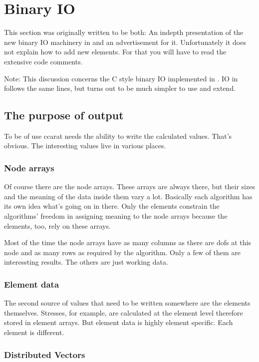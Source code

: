 \chapter{Binary IO}

This section was originally written to be both: An indepth presentation of the
new binary IO machinery in \ccarat{} and an advertisement for
it. Unfortunately it does not explain how to add new elements. For that you
will have to read the extensive code comments.

Note: This discussion concerns the C style binary IO implemented in
\ccarat{}. IO in \baci{} follows the same lines, but turns out to be much
simpler to use and extend.

\section{The purpose of output}

To be of use ccarat needs the ability to write the calculated values.
That's obvious. The interesting values live in various places.


\subsection{Node arrays}

Of course there are the node arrays. These arrays are always there,
but their sizes and the meaning of the data inside them vary a lot.
Basically each algorithm has its own idea what's going on in there.
Only the elements constrain the algorithms' freedom in assigning meaning
to the node arrays because the elements, too, rely on these arrays.

Most of the time the node arrays have as many columns as there are
dofs at this node and as many rows as required by the algorithm. Only
a few of them are interessting results. The others are just working
data.


\subsection{Element data}

The second source of values that need to be written somewhere are
the elements themselves. Stresses, for example, are calculated at
the element level therefore stored in element arrays. But element
data is highly element specific. Each element is different.


\subsection{Distributed Vectors}

